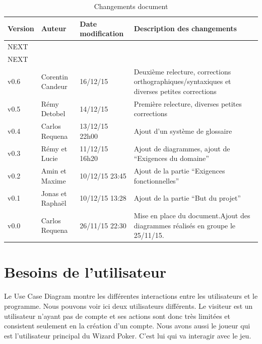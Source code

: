 \documentclass[11pt,a4paper]{article}
\begin{document}
\begin{table}[h]
  \centering
  \begin{tabular}[ht]{|l|l|l|p{18em}|}
    \hline

    \textbf{Version}
    & \textbf{Auteur}
    & \textbf{Date modification}
    & \textbf{Description des changements}\\ \hline \hline
    NEXT &  &  &  \\ \hline
    NEXT &  &  &  \\ \hline
     v0.6 & Corentin Candeur & 16/12/15 & Deuxième relecture, corrections orthographiques/syntaxiques et diverses petites corrections \\ \hline
    v0.5 & Rémy Detobel & 14/12/15 & Première relecture, diverses petites corrections \\ \hline
    v0.4 & Carlos Requena  & 13/12/15 22h00 & Ajout d'un système de glossaire \\ \hline
    v0.3 & Rémy et Lucie  & 11/12/15 16h20 & Ajout de diagrammes, ajout de ``Exigences du domaine'' \\ \hline
    v0.2 & Amin et Maxime & 10/12/15 23:45 & Ajout de la partie ``Exigences fonctionnelles''\\ \hline
    v0.1 & Jonas et Raphaël & 10/12/15 13:28 & Ajout de la partie ``But du projet''\\ \hline
    v0.0 & Carlos Requena & 26/11/15 22:30 & Mise en place du document.Ajout des diagrammes réalisés en groupe le 25/11/15.\\ \hline
  \end{tabular}
  \caption{Changements document}
  \label{tab:hist}
\end{table}


\glsaddall
\printnoidxglossaries


\section{Besoins de l'utilisateur}
\label{sec:besoins}

Le Use Case Diagram montre les différentes interactions entre les
utilisateurs et le programme.  Nous pouvons voir ici deux utilisateurs
différents.  Le visiteur est un utilisateur n'ayant pas de compte et ses
actions sont donc très limitées et consistent seulement en la création d'un compte.
Nous avons aussi le joueur qui est l'utilisateur principal du Wizard Poker.
C'est lui qui va interagir avec le jeu.
\end{document}
